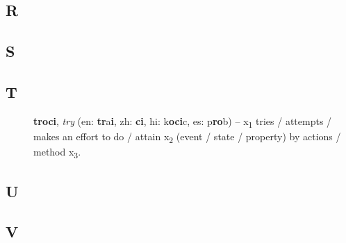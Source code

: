 \documentclass[12pt]{book}
\begin{document}
\begin{description}
\item[ ]
\end{description}

\subsection{R} %

\begin{description}
\item[ ]
\end{description}

\subsection{S} %

\begin{description}
\item[ ]
\end{description}

\subsection{T} %

\begin{description}
\item[ ] \textbf{troci}, \textit{try} (en: \textbf{tr}a\textbf{i}, zh: \textbf{ci}, hi: k\textbf{oci}c, es: p\textbf{ro}b) -- x\textsubscript{1} tries / attempts / makes an effort to do / attain x\textsubscript{2} (event / state / property) by actions / method x\textsubscript{3}.
\end{description}

\subsection{U} %

\begin{description}
\item[ ]
\end{description}

\subsection{V} %

\begin{description}
\item[ ]
\end{description}
\end{document}
